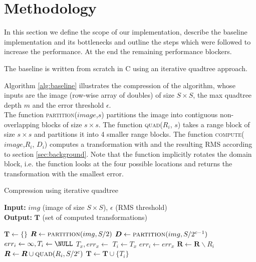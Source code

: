 \section{Methodology}\label{sec:yourmethod}

In this section we define the scope of our implementation, describe the baseline
implementation and its bottlenecks and outline the steps which were followed to
increase the performance. At the end the remaining performance blockers.

The baseline is written from scratch in C using an iterative quadtree approach.

Algorithm \ref{alg:baseline} illustrates the compression of the algorithm, whose inputs are the image (row-wise array of doubles) of size $S \times S$,
the max quadtree depth $m$ and the error threshold $\epsilon$.\\
The function \textsc{partition($image$,$s$)} partitions the image into contiguous non-overlapping blocks of size $s \times s$.
The function \textsc{quad($R_i$, $s$)} takes a range block of size $s \times s$ and partitions it into 4 smaller range blocks.
The function \textsc{compute($image$,$R_i$, $D_i$)} computes a transformation with and the resulting RMS according to section \ref{sec:background}. 
Note that the function implicitly rotates the domain block, i.e. the function looks at the four possible locations and returns the transformation with the smallest error.
\begin{algorithm}
\caption{Compression using iterative quadtree}\label{alg:baseline}
\hspace*{\algorithmicindent} \textbf{Input:} $img$ (image of size $S \times S$), $\epsilon$ (RMS threshold) \\
\hspace*{\algorithmicindent} \textbf{Output:} $\boldsymbol{T}$ (set of computed transformations)
\begin{algorithmic}[1]
  \State $\boldsymbol{T} \gets \{\}$  
  \State $\boldsymbol{R} \gets \Call{partition}{img, S/2}$  
     
        \State $\boldsymbol{D} \gets \Call{partition}{img, S/2^{c-1}}$
            \State $err_i \gets \infty, T_i \gets \NULL$
              \State $T_x, err_x \gets $ 
                \State $T_i \gets T_x$
                \State $err_i \gets err_x$
              \EndIf
            \EndFor
        \EndFor
        \State $\boldsymbol{R} \gets \boldsymbol{R} \backslash  R_i$ 
          \State $\boldsymbol{R} \gets \boldsymbol{R} \cup  \Call{quad}{R_i, S/2^c}$
        \Else
          \State $\boldsymbol{T} \gets \boldsymbol{T} \cup \{T_i\}$
        \EndIf
    \EndFor
\end{algorithmic}
\end{algorithm}

